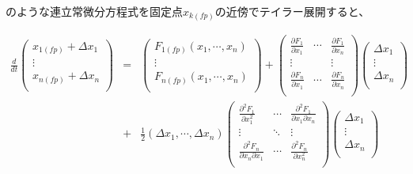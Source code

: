 のような連立常微分方程式を固定点\(x_{k(fp)}\)の近傍でテイラー展開すると、

\[
\begin{array}{ccl}
\displaystyle\frac{d}{dt}
\left(
\begin{array}{c}
x_{1(fp)}+\Delta x_1\\
\vdots \\
x_{n(fp)}+\Delta x_n\\
\end{array}
\right)
& = &
\left(
\begin{array}{c}
F_{1(fp)}(x_1, \cdots , x_n)\\
\vdots \\
F_{n(fp)}(x_1, \cdots , x_n)\\
\end{array}
\right)

+

\left(
\begin{array}{ccc}
\frac{\partial F_1}{\partial x_1} & \cdots & \frac{\partial F_1}{\partial x_n} \\
\vdots                            &        & \vdots\\
\frac{\partial F_n}{\partial x_1} & \cdots & \frac{\partial F_n}{\partial x_n} \\
\end{array}
\right)
\left(
\begin{array}{c}
\Delta x_1\\
\vdots \\
\Delta x_n\\
\end{array}
\right)\\

&
+
&
\displaystyle\frac{1}{2}
\left( \Delta x_1 , \cdots , \Delta x_n \right)
\left(
\begin{array}{ccc}
\frac{\partial^2 F_1}{\partial x_1^2} & \cdots & \frac{\partial^2 F_1}{\partial x_1 \partial x_n} \\
\vdots                            &    \ddots    & \vdots\\
\frac{\partial^2 F_n}{\partial x_n \partial x_1} & \cdots & \frac{\partial^2 F_n}{\partial x_n^2} \\
\end{array}
\right)
\left(
\begin{array}{c}
\Delta x_1\\
\vdots \\
\Delta x_n\\
\end{array}
\right)\\

\end{array}
\]

